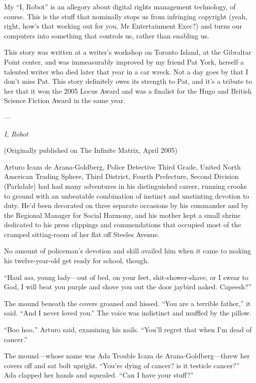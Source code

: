 My “I, Robot” is an allegory about digital rights management
technology, of course. This is the stuff that nominally stops us
from infringing copyright (yeah, right, how’s that working out for
you, Mr Entertainment Exec?) and turns our computers into something
that controls us, rather than enabling us.

This story was written at a writer’s workshop on Toronto Island, at
the Gibraltar Point center, and was immeasurably improved by my
friend Pat York, herself a talented writer who died later that year
in a car wreck. Not a day goes by that I don’t miss Pat. This story
definitely owes its strength to Pat, and it’s a tribute to her that
it won the 2005 Locus Award and was a finalist for the Hugo and
British Science Fiction Award in the same year.

—

\emph{I, Robot}

(Originally published on The Infinite Matrix, April 2005)

Arturo Icaza de Arana-Goldberg, Police Detective Third Grade,
United North American Trading Sphere, Third District, Fourth
Prefecture, Second Division (Parkdale) had had many adventures in
his distinguished career, running crooks to ground with an
unbeatable combination of instinct and unstinting devotion to duty.
He’d been decorated on three separate occasions by his commander
and by the Regional Manager for Social Harmony, and his mother kept
a small shrine dedicated to his press clippings and commendations
that occupied most of the cramped sitting-room of her flat off
Steeles Avenue.

No amount of policeman’s devotion and skill availed him when it
came to making his twelve-year-old get ready for school, though.

“Haul \emph{ass}, young lady—out of bed, on your feet,
shit-shower-shave, or I swear to God, I will beat you purple and
shove you out the door jaybird naked. Capeesh?”

The mound beneath the covers groaned and hissed. “You are a
terrible father,” it said. “And I never loved you.” The voice was
indistinct and muffled by the pillow.

“Boo hoo,” Arturo said, examining his nails. “You’ll regret that
when I’m dead of cancer.”

The mound—whose name was Ada Trouble Icaza de Arana-Goldberg—threw
her covers off and sat bolt upright. “You’re dying of cancer? is it
testicle cancer?” Ada clapped her hands and squealed. “Can I have
your stuff?”

